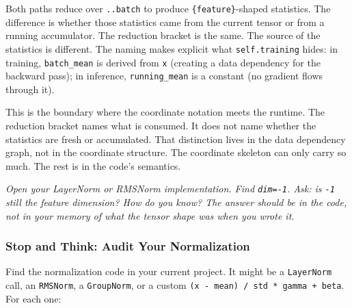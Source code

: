 \documentclass[11pt,titlepage]{article}
\begin{document}
Both paths reduce over \texttt{..batch} to produce
\texttt{\{feature\}}-shaped statistics. The difference is whether those
statistics came from the current tensor or from a running accumulator.
The reduction bracket is the same. The source of the statistics is
different. The naming makes explicit what \texttt{self.training} hides:
in training, \texttt{batch\_mean} is derived from \texttt{x} (creating a
data dependency for the backward pass); in inference,
\texttt{running\_mean} is a constant (no gradient flows through it).

This is the boundary where the coordinate notation meets the runtime.
The reduction bracket names what is consumed. It does not name whether
the statistics are fresh or accumulated. That distinction lives in the
data dependency graph, not in the coordinate structure. The coordinate
skeleton can only carry so much. The rest is in the code's semantics.

\vspace{2em}

\emph{Open your LayerNorm or RMSNorm implementation. Find
\texttt{dim=-1}. Ask: is \texttt{-1} still the feature dimension? How do
you know? The answer should be in the code, not in your memory of what
the tensor shape was when you wrote it.}

\vspace{2em}

\hypertarget{stop-and-think-audit-your-normalization}{%
\subsubsection{Stop and Think: Audit Your
Normalization}\label{stop-and-think-audit-your-normalization}}

Find the normalization code in your current project. It might be a
\texttt{LayerNorm} call, an \texttt{RMSNorm}, a \texttt{GroupNorm}, or a
custom \texttt{(x\ -\ mean)\ /\ std\ *\ gamma\ +\ beta}. For each one:
\end{document}
